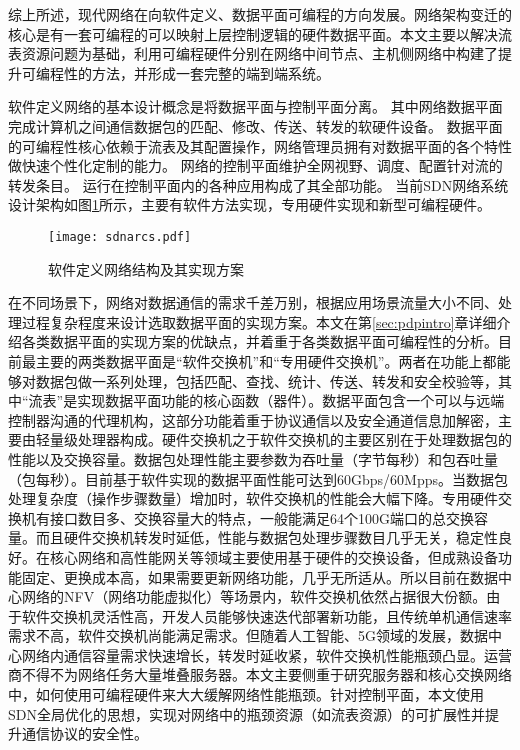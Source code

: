 综上所述，现代网络在向软件定义、数据平面可编程的方向发展。网络架构变迁的核心是有一套可编程的可以映射上层控制逻辑的硬件数据平面。本文主要以解决流表资源问题为基础，利用可编程硬件分别在网络中间节点、主机侧网络中构建了提升可编程性的方法，并形成一套完整的端到端系统。

\label{chap112}

软件定义网络的基本设计概念是将数据平面与控制平面分离。
其中网络数据平面完成计算机之间通信数据包的匹配、修改、传送、转发的软硬件设备。
数据平面的可编程性核心依赖于流表及其配置操作，网络管理员拥有对数据平面的各个特性做快速个性化定制的能力。
网络的控制平面维护全网视野、调度、配置针对流的转发条目。
运行在控制平面内的各种应用构成了其全部功能。
当前SDN网络系统设计架构如图\ref{fig:sdnarcs}所示，主要有软件方法实现，专用硬件实现和新型可编程硬件。

\begin{figure}[!ht]
	\centering
	\texttt{[image: sdnarcs.pdf]}
	\caption{软件定义网络结构及其实现方案} \label{fig:sdnarcs}
\end{figure}

在不同场景下，网络对数据通信的需求千差万别，根据应用场景流量大小不同、处理过程复杂程度来设计选取数据平面的实现方案。本文在第\ref{sec:pdpintro}章详细介绍各类数据平面的实现方案的优缺点，并着重于各类数据平面可编程性的分析。目前最主要的两类数据平面是“软件交换机”和“专用硬件交换机”。两者在功能上都能够对数据包做一系列处理，包括匹配、查找、统计、传送、转发和安全校验等，其中“流表”是实现数据平面功能的核心函数（器件）。数据平面包含一个可以与远端控制器沟通的代理机构，这部分功能着重于协议通信以及安全通道信息加解密，主要由轻量级处理器构成。硬件交换机之于软件交换机的主要区别在于处理数据包的性能以及交换容量。数据包处理性能主要参数为吞吐量（字节每秒）和包吞吐量（包每秒）。目前基于软件实现的数据平面性能可达到60Gbps/60Mpps。当数据包处理复杂度（操作步骤数量）增加时，软件交换机的性能会大幅下降。专用硬件交换机有接口数目多、交换容量大的特点，一般能满足64个100G端口的总交换容量。而且硬件交换机转发时延低，性能与数据包处理步骤数目几乎无关，稳定性良好。在核心网络和高性能网关等领域主要使用基于硬件的交换设备，但成熟设备功能固定、更换成本高，如果需要更新网络功能，几乎无所适从。所以目前在数据中心网络的NFV（网络功能虚拟化）等场景内，软件交换机依然占据很大份额。由于软件交换机灵活性高，开发人员能够快速迭代部署新功能，且传统单机通信速率需求不高，软件交换机尚能满足需求。但随着人工智能、5G领域的发展，数据中心网络内通信容量需求快速增长，转发时延收紧，软件交换机性能瓶颈凸显。运营商不得不为网络任务大量堆叠服务器。本文主要侧重于研究服务器和核心交换网络中，如何使用可编程硬件来大大缓解网络性能瓶颈。针对控制平面，本文使用SDN全局优化的思想，实现对网络中的瓶颈资源（如流表资源）的可扩展性并提升通信协议的安全性。

